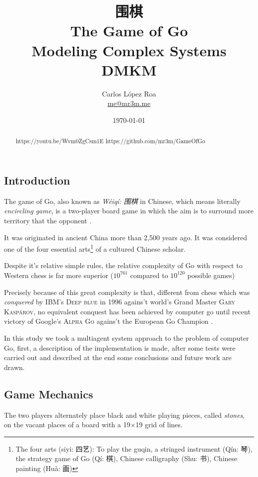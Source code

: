 \documentclass[a4paper,10pt,twocolumn]{article}
\title{围棋 \\ The Game of Go\\ \small Modeling Complex Systems\\ DMKM}
\author{Carlos López Roa\\ \href{mailto:me@mr3m.me}{me@mr3m.me}}
\date{\today}
\begin{document}
\begin{CJK*}{UTF8}{gbsn}
\maketitle
\begin{abstract}
https://youtu.be/Wvm0ZgCsm1E
https://github.com/mr3m/GameOfGo
\end{abstract}


\section{Introduction}
The game of Go, also known as \emph{Wéiqí: 围棋} in Chinese, which means literally \emph{encircling game}, is a two-player board game in which the aim is to surround more territory that the opponent \cite{Kunkle2002}.

It was originated in ancient China more than 2,500 years ago. It was considered one of the four essential arts\footnote{The four arts ({siyi: 四艺}): To play the guqin, a stringed instrument ({Qín:  琴}), the strategy game of Go ({Qí:  棋}), Chinese calligraphy ({Shu:  书}), Chinese painting ({Huà:  画}) } of a cultured Chinese scholar.

Despite it's relative simple rules, the relative complexity of Go with respect to Western chess is far more superior ($10^{761}$ compared to $10^{120}$ possible games)

Precisely because of this great complexity is that, different from chess which was \emph{conquered} by IBM's \textsc{Deep blue} in 1996 agains't world's Grand Master \textsc{Gary Kaspárov}, no equivalent conquest has been achieved by computer go until recent victory of Google's \textsc{Alpha Go} agains't the European Go Champion \cite{Silver2016a}. 

In this study we took a multiagent system approach to the problem of computer Go, first, a description of the implementation is made, after some tests were carried out and described at the end some conclusions and future work are drawn.


\subsection{Game Mechanics}
The two players alternately place black and white playing pieces, called \emph{stones}, on the vacant places of a board with a 19×19 grid of lines. 


\end{CJK*}
\end{document}
